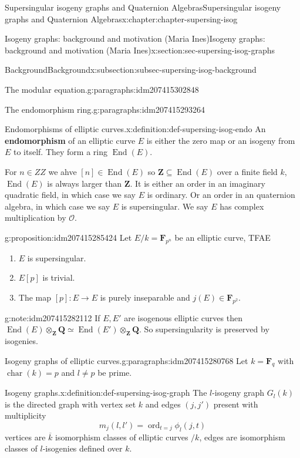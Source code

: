 \documentclass[oneside,10pt,]{book}
\newcommand{\terminology}[1]{\textbf{#1}}
\numberwithin{equation}{section}
\newcommand{\lb}{[}
\newcommand{\rb}{]}
\newcommand{\ZZ}{\mathbf{Z}}
\newcommand{\QQ}{\mathbf{Q}}
\newcommand{\FF}{\mathbf{F}}
\newcommand{\ints}{\mathcal{O}}
\DeclareMathOperator{\End}{End}
\DeclareMathOperator{\characteristic}{char}
\DeclareMathOperator{\ord}{ord}
\begin{document}
\begin{chapterptx}{Supersingular isogeny graphs and Quaternion Algebras}{}{Supersingular isogeny graphs and Quaternion Algebras}{}{}{x:chapter:chapter-supersing-isog}
\begin{sectionptx}{Isogeny graphs: background and motivation (Maria Ines)}{}{Isogeny graphs: background and motivation (Maria Ines)}{}{}{x:section:sec-supersing-isog-graphs}
\begin{subsectionptx}{Background}{}{Background}{}{}{x:subsection:subsec-supersing-isog-background}
\begin{paragraphs}{The modular equation.}{g:paragraphs:idm207415302848}
\end{paragraphs}%
\begin{paragraphs}{The endomorphism ring.}{g:paragraphs:idm207415293264}%
\begin{definition}{Endomorphisms of elliptic curves.}{x:definition:def-supersing-isog-endo}%
An \terminology{endomorphism} of an elliptic curve \(E\) is either the zero map or an isogeny from \(E\) to itself. They form a ring \(\End(E)\).%
\end{definition}
For \(n \in ZZ\) we ahve \(\lb n \rb \in \End(E)\) so \(\ZZ \subseteq \End(E)\) over a finite field \(k\), \(\End(E)\) is always larger than \(\ZZ\). It is either an order in an imaginary quadratic field, in which case we say \(E\) is ordinary. Or an order in an quaternion algebra, in which case we say \(E\) is supersingular. We say \(E\) has complex multiplication by \(\ints\).%
\begin{proposition}{}{}{g:proposition:idm207415285424}%
Let \(E/k = \FF_{p^n}\) be an elliptic curve, TFAE%
\begin{enumerate}
\item{}\(E\) is supersingular.%
\item{}\(E\lb p\rb\) is trivial.%
\item{}The map \(\lb p\rb \colon E\to E\) is purely inseparable and \(j(E) \in \FF_{p^2}\).%
\end{enumerate}
%
\end{proposition}
\begin{note}{}{g:note:idm207415282112}%
If \(E,E'\) are isogenous elliptic curves then \(\End(E) \otimes_\ZZ \QQ \simeq \End(E')\otimes_\ZZ \QQ\). So supersingularity is preserved by isogenies.%
\end{note}
\end{paragraphs}%
\begin{paragraphs}{Isogeny graphs of elliptic curves.}{g:paragraphs:idm207415280768}%
Let \(k = \FF_q\) with \(\characteristic(k) = p\) and \(l \ne p \) be prime.%
\begin{definition}{Isogeny graphs.}{x:definition:def-supersing-isog-graph}%
The \(l\)-isogeny graph \(G_l(k)\) is the directed graph with vertex set \(k\) and edges \((j,j')\) present with multiplicity%
\begin{equation*}
m_j(l,l') = \ord_{t=j} \phi_l(j,t)
\end{equation*}
vertices are \(\overline k\) isomorphism classes of  elliptic curves \(/k\), edges are isomorphism classes of \(l\)-isogenies defined over \(k\).%
\end{definition}

\end{paragraphs}
\end{subsectionptx}
\end{sectionptx}
\end{chapterptx}
\end{document}

